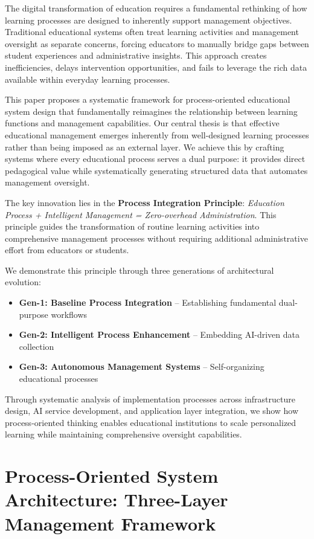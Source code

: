 \documentclass[conference]{IEEEtran}
\begin{document}
The digital transformation of education requires a fundamental rethinking of how learning processes are designed to inherently support management objectives. Traditional educational systems often treat learning activities and management oversight as separate concerns, forcing educators to manually bridge gaps between student experiences and administrative insights. This approach creates inefficiencies, delays intervention opportunities, and fails to leverage the rich data available within everyday learning processes.

This paper proposes a systematic framework for process-oriented educational system design that fundamentally reimagines the relationship between learning functions and management capabilities. Our central thesis is that effective educational management emerges inherently from well-designed learning processes rather than being imposed as an external layer. We achieve this by crafting systems where every educational process serves a dual purpose: it provides direct pedagogical value while systematically generating structured data that automates management oversight.

The key innovation lies in the \textbf{Process Integration Principle}: \textit{Education Process + Intelligent Management = Zero-overhead Administration}. This principle guides the transformation of routine learning activities into comprehensive management processes without requiring additional administrative effort from educators or students.

We demonstrate this principle through three generations of architectural evolution:
\begin{itemize}
    \item \textbf{Gen-1: Baseline Process Integration} – Establishing fundamental dual-purpose workflows
    \item \textbf{Gen-2: Intelligent Process Enhancement} – Embedding AI-driven data collection
    \item \textbf{Gen-3: Autonomous Management Systems} – Self-organizing educational processes
\end{itemize}

Through systematic analysis of implementation processes across infrastructure design, AI service development, and application layer integration, we show how process-oriented thinking enables educational institutions to scale personalized learning while maintaining comprehensive oversight capabilities.

\section{Process-Oriented System Architecture: Three-Layer Management Framework}
\end{document}
